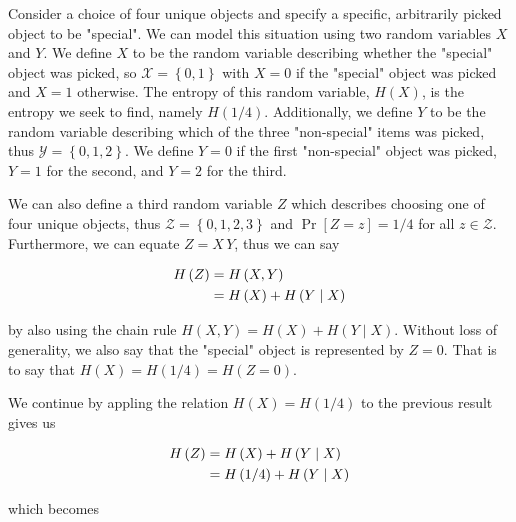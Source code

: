 \documentclass[ClusteringConnectionsMAIN.tex]{subfiles}
\begin{document}
	
  Consider a choice of four unique objects and specify a specific, arbitrarily picked object to be "special".  We can model this situation using two random variables $X$ and $Y$.  We define $X$ to be the random variable describing whether the "special" object was picked, so $\mathcal{X} = \left\{ 0, 1 \right\}$ with $X = 0$ if the "special" object was picked and $X = 1$ otherwise.  The entropy of this random variable, $H \left( X \right)$, is the entropy we seek to find, namely $H \left( 1 / 4 \right)$.  Additionally, we define $Y$ to be the random variable describing which of the three "non-special" items was picked, thus $\mathcal{Y} = \left\{ 0, 1, 2 \right\}$.  We define $Y = 0$ if the first "non-special" object was picked, $Y = 1$ for the second, and $Y = 2$ for the third. \newline

We can also define a third random variable $Z$ which describes choosing one of four unique objects, thus $\mathcal{Z} = \left\{ 0, 1, 2, 3\right\}$ and $\Pr \left[ Z = z \right] = 1 / 4$ for all $z \in \mathcal{Z}$.  Furthermore, we can equate $Z = X \, Y$, thus we can say

\begin{align} 
	H \left( Z \right) &= H \left( X, Y \right) \notag \\
	&= H \left( X \right) + H \left( Y \mid X \right) \notag
\end{align}

by also using the chain rule $H \left( X, Y \right) = H \left( X \right) + H \left( Y \mid X \right)$.  Without loss of generality, we also say that the "special" object is represented by $Z = 0$.  That is to say that  $H \left( X \right) = H \left( 1 / 4 \right) = H \left( Z = 0 \right)$.  \newline


We continue by appling the relation $H \left( X \right) = H \left( 1 / 4 \right)$ to the previous result gives us

\begin{align}
H \left( Z \right) &= H \left( X \right) + H \left( Y \mid X \right) \notag \\
&= H \left( 1/4 \right) + H \left( Y \mid X \right) \notag
\end{align}

which becomes
\end{document}
